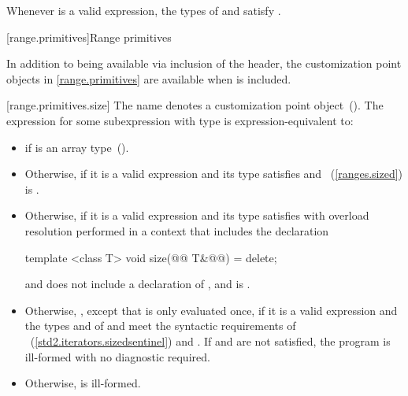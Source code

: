\pnum
\enternote Whenever  is a valid expression, the
types of  and  satisfy
. \exitnote

[range.primitives]{Range primitives}

\pnum
In addition to being available via inclusion of the 
header, the customization point objects in \ref{range.primitives} are
available when  is included.

[range.primitives.size]{}
\pnum
The name  denotes a customization point
object~(). The expression
 for some subexpression  with type
 is expression-equivalent to:

\begin{itemize}
\item
   if  is an array
  type~().

\item
  Otherwise,
  if it is a valid expression and its type  satisfies
   and
  ~(\ref{ranges.sized})
  is .

\item
  Otherwise,
  if it is a valid expression and its type  satisfies 
  with overload resolution performed in a context that includes the
   declaration\added{:}
  \begin{codeblock}
  template <class T> void size(@@ T&@\added{\&}@) = delete;
  \end{codeblock}
  and does not include a declaration of , and
   is .

\item
  Otherwise,
  ,
  except that  is only evaluated once, if it is a valid expression and
  the types  and  of  and
   meet the syntactic requirements
  of ~(\ref{std2.iterators.sizedsentinel}) and
  . If  and
   are not satisfied, the program is ill-formed
  with no diagnostic required.

\item
  Otherwise,  is ill-formed.
\end{itemize}

